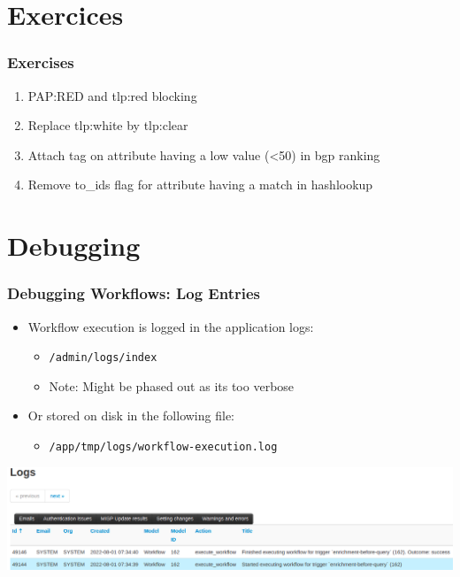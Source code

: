 \section{Exercices}
\begin{frame}
    \frametitle{Exercises}
    \begin{enumerate}
        \item PAP:RED and tlp:red blocking
        \item Replace tlp:white by tlp:clear
        \item Attach tag on attribute having a low value (<50) in bgp ranking
        \item Remove to\_ids flag for attribute having a match in hashlookup
    \end{enumerate}
\end{frame}

\section{Debugging}
\begin{frame}
    \frametitle{Debugging Workflows: Log Entries}
    \begin{itemize}
        \item Workflow execution is logged in the application logs:
        \begin{itemize}
            \item \texttt{/admin/logs/index}
            \item Note: Might be phased out as its too verbose
        \end{itemize}
        \item Or stored on disk in the following file:
        \begin{itemize}
            \item \texttt{/app/tmp/logs/workflow-execution.log}
        \end{itemize}
    \end{itemize}
    \begin{center}
        \includegraphics[width=1.0\linewidth]{pictures/workflow-debug.png}
    \end{center}
\end{frame}

